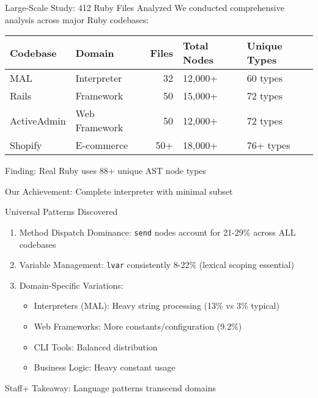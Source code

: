 \documentclass[presentation,aspectratio=169]{beamer}
\begin{document}
\begin{frame}[label={sec:orgb4bbefa}]{Large-Scale Study: 412 Ruby Files Analyzed}
We conducted comprehensive analysis across major Ruby codebases:

\begin{center}
\begin{center}
\begin{tabular}{llrll}
Codebase & Domain & Files & Total Nodes & Unique Types\\
\hline
\alert{MAL} & Interpreter & 32 & 12,000+ & 60 types\\
Rails & Framework & 50 & 15,000+ & 72 types\\
ActiveAdmin & Web Framework & 50 & 12,000+ & 72 types\\
Shopify & E-commerce & 50+ & 18,000+ & 76+ types\\
\end{tabular}
\end{center}
\end{center}

\pause

\begin{center}
\alert{Finding}: Real Ruby uses 88+ unique AST node types

\alert{Our Achievement}: Complete interpreter with minimal subset
\end{center}
\end{frame}
\begin{frame}[label={sec:orgf5084dc},fragile]{Universal Patterns Discovered}
 \begin{enumerate}[<+->]
\item \alert{Method Dispatch Dominance}: \texttt{send} nodes account for 21-29\% across ALL codebases
\item \alert{Variable Management}: \texttt{lvar} consistently 8-22\% (lexical scoping essential)
\item \alert{Domain-Specific Variations}:
\begin{itemize}
\item \alert{Interpreters} (MAL): Heavy string processing (13\% vs 3\% typical)
\item \alert{Web Frameworks}: More constants/configuration (9.2\%)
\item \alert{CLI Tools}: Balanced distribution
\item \alert{Business Logic}: Heavy constant usage
\end{itemize}
\end{enumerate}

\pause

\alert{Staff+ Takeaway}: Language patterns transcend domains
\end{frame}
\end{document}
